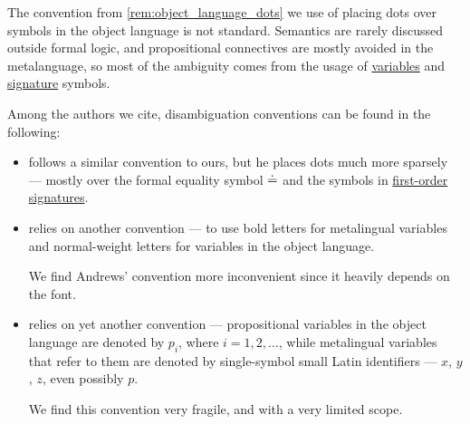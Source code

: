 \begin{remark}\label{rem:object_language_disambiguation_conventions}
  The convention from \cref{rem:object_language_dots} we use of placing dots over symbols in the object language is not standard. Semantics are rarely discussed outside formal logic, and propositional connectives are mostly avoided in the metalanguage, so most of the ambiguity comes from the usage of \hyperref[con:variable]{variables} and \hyperref[con:logical_system_signature]{signature} symbols.

  Among the authors we cite, disambiguation conventions can be found in the following:
  \begin{itemize}
    \item {} follows a similar convention to ours, but he places dots much more sparsely --- mostly over the formal equality symbol \( {\doteq} \) and the symbols in \hyperref[def:first_order_signature]{first-order signatures}.

    \item {} relies on another convention --- to use bold letters for metalingual variables and normal-weight letters for variables in the object language.

    We find Andrews' convention more inconvenient since it heavily depends on the font.

    \item {} relies on yet another convention --- propositional variables in the object language are denoted by \( p_i \), where \( i = 1, 2, \ldots \), while metalingual variables that refer to them are denoted by single-symbol small Latin identifiers --- \( x \), \( y \), \( z \), even possibly \( p \).

    We find this convention very fragile, and with a very limited scope.
  \end{itemize}
\end{remark}
